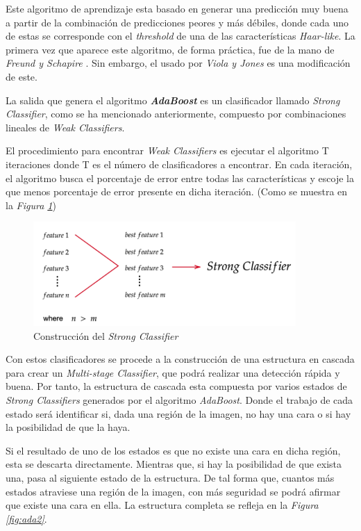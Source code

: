 Este algoritmo de aprendizaje esta basado en generar una predicción muy buena a partir de la combinación de predicciones peores y más débiles, donde cada uno de estas se corresponde con el \textit{threshold} de una de las características \textit{Haar-like}. La primera vez que aparece este algoritmo, de forma práctica, fue de la mano de \textit{Freund y Schapire} \cite{adaboost1}. Sin embargo, el usado por \textit{Viola y Jones} es una modificación de este.

La salida que genera el algoritmo \textbf{\textit{AdaBoost}} es un clasificador llamado \textit{Strong Classifier}, como se ha mencionado anteriormente, compuesto por combinaciones lineales de \textit{Weak Classifiers}. 

El procedimiento para encontrar \textit{Weak Classifiers} es ejecutar el algoritmo T iteraciones donde T es el número de clasificadores a encontrar. En cada iteración, el algoritmo busca el porcentaje de error entre todas las características y escoje la que menos porcentaje de error presente en dicha iteración. (Como se muestra en la \textit{Figura \ref{fig:ada1}}) \cite{adaboost2}

\begin{figure}[htp]
	\centering
	\includegraphics[width=10cm]{imagenes/ada1.png}
	\caption{Construcción del \textit{Strong Classifier}}
	\label{fig:ada1}
\end{figure}

Con estos clasificadores se procede a la construcción de una estructura en cascada para crear un \textit{Multi-stage Classifier}, que podrá realizar una detección rápida y buena. Por tanto, la estructura de cascada esta compuesta por varios estados de \textit{Strong Classifiers} generados por el algoritmo \textit{AdaBoost}. Donde el trabajo de cada estado será identificar si, dada una región de la imagen, no hay una cara o si hay la posibilidad de que la haya. \cite{adaboost1}

Si el resultado de uno de los estados es que no existe una cara en dicha región, esta se descarta directamente. Mientras que, si hay la posibilidad de que exista una, pasa al siguiente estado de la estructura. De tal forma que, cuantos más estados atraviese una región de la imagen, con más seguridad se podrá afirmar que existe una cara en ella. La estructura completa se refleja en la \textit{Figura \ref{fig:ada2}}.

